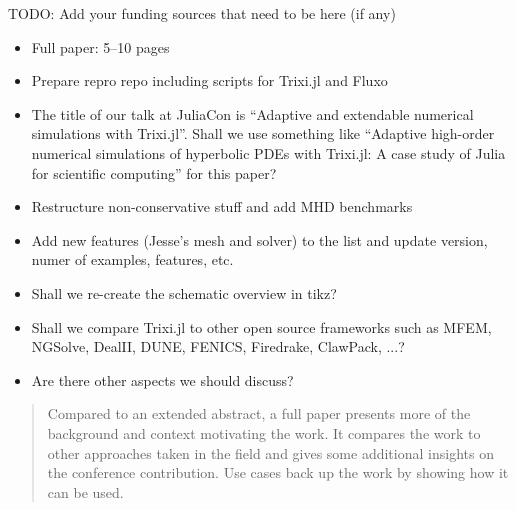 \documentclass{juliacon}
\makeatletter
\newcommand{\etc}[0]{{etc.\@}\xspace}
\newcommand{\trixi}{Trixi.jl\xspace}
\newcommand{\todo}[1]{{\color{red}#1}}
\makeatother
\begin{document}
\todo{TODO: Add your funding sources that need to be here (if any)} %





\todo{ %
\begin{itemize}
  \item Full paper: 5--10 pages
  \item Prepare repro repo including scripts for \trixi and Fluxo
  \item The title of our talk at JuliaCon is
  ``Adaptive and extendable numerical simulations with Trixi.jl''.
  Shall we use something like
  ``Adaptive high-order numerical simulations of hyperbolic PDEs with Trixi.jl:
  A case study of Julia for scientific computing'' for this paper?
  \item Restructure non-conservative stuff and add MHD benchmarks
  \item Add new features (Jesse's mesh and solver) to the list and update version, numer of examples, features, \etc
  \item Shall we re-create the schematic overview in tikz?
  \item Shall we compare \trixi to other open source frameworks such as MFEM, NGSolve, DealII, DUNE, FENICS, Firedrake, ClawPack, ...?
  \item Are there other aspects we should discuss?
\end{itemize}
\begin{quote}
  Compared to an extended abstract, a full paper presents more of the background
  and context motivating the work. It compares the work to other approaches taken
  in the field and gives some additional insights on the conference contribution.
  Use cases back up the work by showing how it can be used.
\end{quote}}
\end{document}
